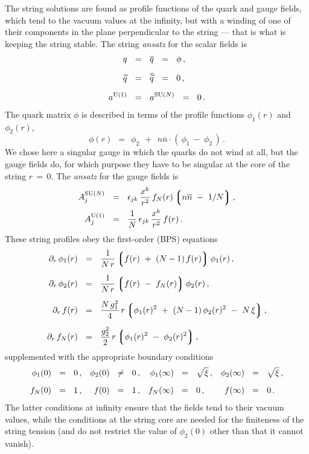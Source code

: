 \documentclass[12pt]{article}
\def\beq{\begin{equation}}
\def\eeq{\end{equation}}
\newcommand{\p}{\partial}
\newcommand{\wt}{\widetilde}
\newcommand{\ov}{\overline}
\newcommand{\lgr}{\left\lgroup}
\newcommand{\rgr}{\right\rgroup}
\newcommand{\aU}{a^{\rm U(1)}}
\newcommand{\aN}{a^\text{SU($N$)}}
\newcommand{\nnbar}{n\ov{n}}
\newcommand{\qt}{\wt{q}}
\newcommand{\bq}{\ov{q}}
\newcommand{\bqt}{\overline{\widetilde{q}}}
\newcommand{\ansatz}{{\it ansatz} }
\begin{document}
	The string solutions are found as profile functions of the quark and gauge fields, which tend
	to the vacuum values at the infinity, but with a winding of one of their components 
	in the plane perpendicular to the string --- that is what is keeping the string stable.
	The string \ansatz for the scalar fields is
\begin{align}
%
\notag
	q    & ~~=~~    \bq    ~~=~~    \phi\,,    \\[2mm]
%
\label{qansatz}
	\qt    & ~~=~~    \bqt    ~~=~~    0\,,    \\[2mm]
%
\notag
	\aU    & ~~=~~    \aN    ~~=~~    0\,.
\end{align}
	The quark matrix $ \phi $ is described in terms of the profile functions $ \phi_1(r) $ and $ \phi_2(r) $,
\beq
	\phi(r)    ~~=~~    \phi_2  ~~+~~  \nnbar \cdot (\, \phi_1 ~-~ \phi_2 \,)\,.
\eeq
	We chose here a singular gauge in which the quarks do not wind at all, but the gauge fields do,
	for which purpose they have to be singular at the core of the string $ r \,=\, 0 $.
	The \ansatz for the gauge fields is
\begin{align}
%
\notag
	A_j^\text{SU($N$)}    & ~~=~~    \epsilon_{jk}\, \frac{x^k}{r^2}\, f_N(r) \lgr \nnbar ~-~ 1/N \rgr ,
	\\
%
\label{Aansatz}
	A_j^\text{U(1)}    & ~~=~~    \frac{1}{N}\, \epsilon_{jk}\, \frac{x^k}{r^2}\, f(r)\,.
\end{align}
	These string profiles obey the first-order (BPS) equations
\begin{align}
%
\notag
	\p_r\, \phi_1(r)    & ~~=~~    \frac{1}{N\,r} \lgr f(r) ~+~ (N - 1)\,f(r) \rgr \phi_1(r)\,,
	\\[2mm]
%
\notag
	\p_r\, \phi_2(r)    & ~~=~~    \frac{1}{N\,r} \lgr f(r) ~-~ f_N(r) \rgr \phi_2(r)\,,
	\\[2mm]
%
\label{BPS}
	\p_r\, f(r)    & ~~=~~    \frac{N\, g_1^2}{4}\, r \lgr \phi_1(r)^2  ~+~ (N-1)\,\phi_2(r)^2  ~-~  N\,\xi \rgr ,
	\\[2mm]
%
\notag
	\p_r\, f_N(r)    & ~~=~~    \frac{g_2^2}{2}\, r \lgr \phi_1(r)^2  ~-~  \phi_2(r)^2 \rgr ,
\end{align}
	supplemented with the appropriate boundary conditions
\begin{align}
%
\notag
	  \phi_1(0)    & ~~=~~    0\,,
	& \phi_2(0)    & ~~\neq~~    0\,,
	& \phi_1(\infty)    & ~~=~~ \sqrt{\xi}\,,
	& \phi_2(\infty)    & ~~=~~ \sqrt{\xi}\,,
	\\[2mm]
%
	f_N(0)    & ~~=~~ 1\,,
	& f(0)    & ~~=~~ 1\,,
	& f_N(\infty)    & ~~=~~ 0\,,
	& f(\infty)    & ~~=~~ 0\,.
\end{align}
	The latter conditions at infinity ensure that the fields tend to their vacuum values, while
	the conditions at the string core are needed for the finiteness of the string tension 
	(and do not restrict the value of $ \phi_2(0) $ other than that it cannot vanish).
\end{document}
